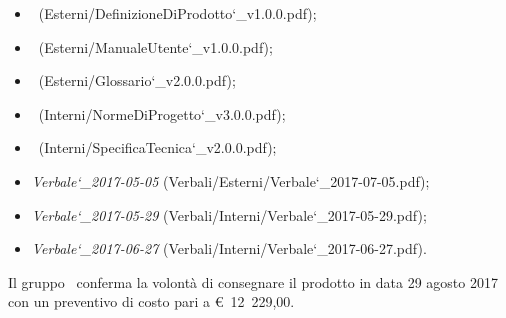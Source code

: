 \documentclass[a4paper,12pt]{article}
\begin{document}
\begin{titlepage}
\begin{itemize}
			\item {}\ (Esterni/DefinizioneDiProdotto\char`_v1.0.0.pdf);
			\item \manualeutenteRQ\ (Esterni/ManualeUtente\char`_v1.0.0.pdf);
			\item \glossarioRQ\ (Esterni/Glossario\char`_v2.0.0.pdf);
			\item \normediprogettoRQ\ (Interni/NormeDiProgetto\char`_v3.0.0.pdf);	
			\item \specificatecnicaRQ\ (Interni/SpecificaTecnica\char`_v2.0.0.pdf);
			\item \textit{Verbale\char`_2017-05-05} (Verbali/Esterni/Verbale\char`_2017-07-05.pdf);
			\item \textit{Verbale\char`_2017-05-29} (Verbali/Interni/Verbale\char`_2017-05-29.pdf);
			\item \textit{Verbale\char`_2017-06-27} (Verbali/Interni/Verbale\char`_2017-06-27.pdf).
		\end{itemize}	
		Il gruppo \kaleidoscode\ conferma la volontà di consegnare il prodotto in data 29 agosto 2017
		con un preventivo di costo pari a \hbox{\euro\ 12 229,00}.\\
		

\end{titlepage}
\end{document}
